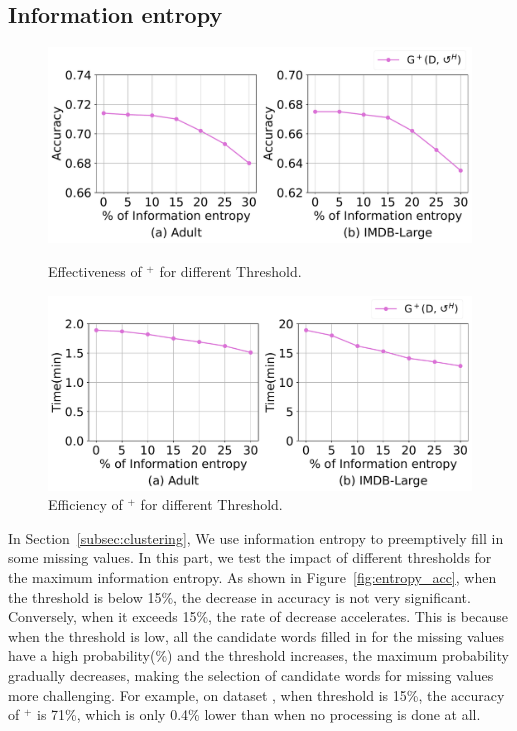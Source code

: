 \subsection{Information entropy}
\label{exp:sec:entropy}

\begin{figure}[t]   
	\centering
	\begin{minipage}[t]{0.49\textwidth}
		\centering
		\includegraphics[width=\columnwidth]{figs/entropy_acc}
		\vspace{-1.5em}
		\caption{Effectiveness of \ours$^+$ for different Threshold.}
		\label{fig:entropy_acc}
	\end{minipage}
	\begin{minipage}[t]{0.49\textwidth}
		\centering
		\includegraphics[width=\columnwidth]{figs/entropy_time}
		\vspace{-1.5em}
		\caption{Efficiency of \ours$^+$ for different Threshold.}
		\label{fig:entropy_time}
	\end{minipage}
	\vspace*{-1em}   
\end{figure}

In Section~\ref{subsec:clustering}, We use information entropy to preemptively fill in some missing values. In this part, we test the impact of different thresholds for the maximum information entropy. As shown in Figure~\ref{fig:entropy_acc}, when the threshold is below 15\%, the decrease in accuracy is not very significant. Conversely, when it exceeds 15\%, the rate of decrease accelerates. This is because when the threshold is low, all the candidate words filled in for the missing values have a high probability(\%) and the threshold increases, the maximum probability gradually decreases, making the selection of candidate words for missing values more challenging. For example, on dataset \imdbl, when threshold is 15\%, the accuracy of \ours$^+$ is 71\%, which is only 0.4\% lower than when no processing is done at all.

